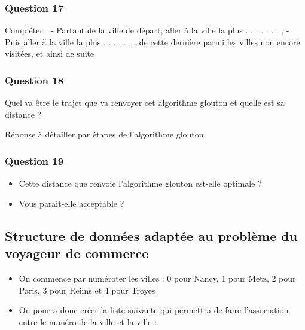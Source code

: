 \documentclass[
  paper=a4,
  ,captions=tableheading
]{scrartcl}
\providecommand{\tightlist}{%
  \setlength{\itemsep}{0pt}\setlength{\parskip}{0pt}}
\begin{document}
\hypertarget{question-17}{%
\subsubsection{Question 17}\label{question-17}}

Compléter : - Partant de la ville de départ, aller à la ville la plus .
. . . . . . , - Puis aller à la ville la plus . . . . . . . de cette
dernière parmi les villes non encore visitées, et ainsi de suite

\hypertarget{question-18}{%
\subsubsection{Question 18}\label{question-18}}

Quel va être le trajet que va renvoyer cet algorithme glouton et quelle
est sa distance ?

Réponse à détailler par étapes de l'algorithme glouton.

\hypertarget{question-19}{%
\subsubsection{Question 19}\label{question-19}}

\begin{itemize}
\tightlist
\item
  Cette distance que renvoie l'algorithme glouton est-elle optimale ?
\item
  Vous parait-elle acceptable ?
\end{itemize}

\hypertarget{structure-de-donnuxe9es-adaptuxe9e-au-probluxe8me-du-voyageur-de-commerce}{%
\subsection{Structure de données adaptée au problème du voyageur de
commerce}\label{structure-de-donnuxe9es-adaptuxe9e-au-probluxe8me-du-voyageur-de-commerce}}

\begin{itemize}
\tightlist
\item
  On commence par numéroter les villes : 0 pour Nancy, 1 pour Metz, 2
  pour Paris, 3 pour Reims et 4 pour Troyes
\item
  On pourra donc créer la liste suivante qui permettra de faire
  l'association entre le numéro de la ville et la ville :
\end{itemize}
\end{document}
